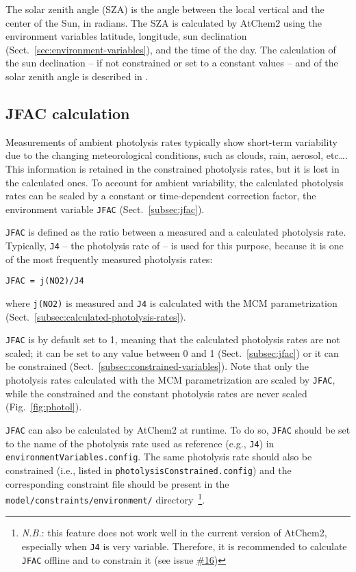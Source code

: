 The solar zenith angle (SZA) is the angle between the local vertical
and the center of the Sun, in radians. The SZA is calculated by
AtChem2 using the environment variables latitude, longitude, sun
declination (Sect.~\ref{sec:environment-variables}), and the time of
the day. The calculation of the sun declination -- if not constrained
or set to a constant values -- and of the solar zenith angle is
described in \citet{madronich_1993}.

\subsection{JFAC calculation} \label{subsec:jfac-calculation}

Measurements of ambient photolysis rates typically show short-term
variability due to the changing meteorological conditions, such as
clouds, rain, aerosol, etc\ldots. This information is retained in the
constrained photolysis rates, but it is lost in the calculated
ones. To account for ambient variability, the calculated photolysis
rates can be scaled by a constant or time-dependent correction factor,
the environment variable \texttt{JFAC} (Sect.~\ref{subsec:jfac}).

\texttt{JFAC} is defined as the ratio between a measured and a
calculated photolysis rate. Typically, \texttt{J4} -- the photolysis
rate of  -- is used for this purpose, because it is one of the
most frequently measured photolysis rates:

\begin{verbatim}
JFAC = j(NO2)/J4
\end{verbatim}

where \texttt{j(NO2)} is measured and \texttt{J4} is calculated with
the MCM parametrization (Sect.~\ref{subsec:calculated-photolysis-rates}).

\texttt{JFAC} is by default set to 1, meaning that the calculated
photolysis rates are not scaled; it can be set to any value between 0
and 1 (Sect.~\ref{subsec:jfac}) or it can be constrained
(Sect.~\ref{subsec:constrained-variables}). Note that only the
photolysis rates calculated with the MCM parametrization are scaled by
\texttt{JFAC}, while the constrained and the constant photolysis rates
are never scaled (Fig.~\ref{fig:photol}).

\texttt{JFAC} can also be calculated by AtChem2 at runtime. To do so,
\texttt{JFAC} should be set to the name of the photolysis rate used as
reference (e.g., \texttt{J4}) in \texttt{environmentVariables.config}.
The same photolysis rate should also be constrained (i.e., listed in
\texttt{photolysisConstrained.config}) and the corresponding
constraint file should be present in the
\texttt{model/constraints/environment/} directory~\footnote{\textit{N.B.}:
  this feature does not work well in the current version of AtChem2,
  especially when \texttt{J4} is very variable. Therefore, it is
  recommended to calculate \texttt{JFAC} offline and to constrain it
  (see issue
  \href{https://github.com/AtChem/AtChem2/issues/16}{\#16})}.

